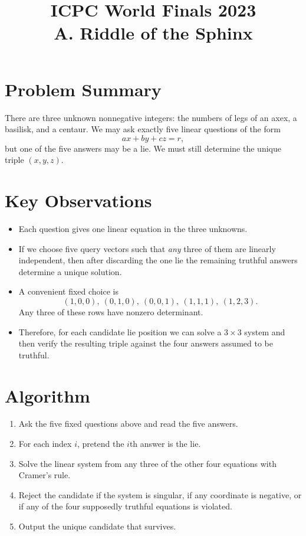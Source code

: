 \documentclass[11pt]{article}
\title{ICPC World Finals 2023\\A. Riddle of the Sphinx}
\author{}
\date{}
\begin{document}
\maketitle

\section*{Problem Summary}

There are three unknown nonnegative integers: the numbers of legs of an axex, a basilisk, and a
centaur. We may ask exactly five linear questions of the form
\[
ax + by + cz = r,
\]
but one of the five answers may be a lie. We must still determine the unique triple $(x,y,z)$.

\section*{Key Observations}

\begin{itemize}[leftmargin=*]
    \item Each question gives one linear equation in the three unknowns.
    \item If we choose five query vectors such that \emph{any} three of them are linearly independent, then
    after discarding the one lie the remaining truthful answers determine a unique solution.
    \item A convenient fixed choice is
    \[
    (1,0,0),\ (0,1,0),\ (0,0,1),\ (1,1,1),\ (1,2,3).
    \]
    Any three of these rows have nonzero determinant.
    \item Therefore, for each candidate lie position we can solve a $3 \times 3$ system and then verify the
    resulting triple against the four answers assumed to be truthful.
\end{itemize}

\section*{Algorithm}

\begin{enumerate}[leftmargin=*]
    \item Ask the five fixed questions above and read the five answers.
    \item For each index $i$, pretend the $i$th answer is the lie.
    \item Solve the linear system from any three of the other four equations with Cramer's rule.
    \item Reject the candidate if the system is singular, if any coordinate is negative, or if any of the four
    supposedly truthful equations is violated.
    \item Output the unique candidate that survives.
\end{enumerate}
\end{document}
